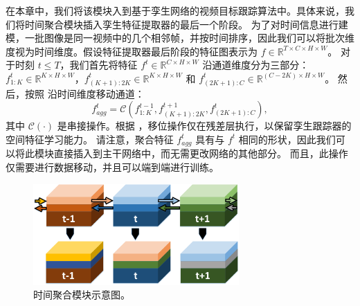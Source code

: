 在本章中，我们将该模块入到基于孪生网络的视频目标跟踪算法中。具体来说，我们将时间聚合模块插入孪生特征提取器的最后一个阶段。
为了对时间信息进行建模，一批图像是同一视频中的几个相邻帧，并按时间排序，因此我们可以将批次维度视为时间维度。假设特征提取器最后阶段的特征图表示为 $f \in \mathbb R ^ {T \times C \times H \times W}$。
对于时刻 $t \leq T$，我们首先将特征 $f^t \in \mathbb R ^ {C \times H \times W}$ 沿通道维度分为三部分：$f_{1:K}^t \in \mathbb R ^ {K \times H \times W}$，$f_{(K+1):2K}^t \in \mathbb R ^ {K \times H \times W}$ 和 $f_{(2K+1):C}^t \in \mathbb R ^ {(C-2K) \times H \times W}$。
然后，按照 \cite{lin2019tsm} 沿时间维度移动通道：
\begin{equation}
    f_{agg}^t = \mathcal{C}(f_{{1:K}}^{t-1}, f_{(K+1):2K}^{t+1}, f_{(2K+1):C}^{t}),
\end{equation}
其中 $\mathcal{C}(\cdot)$ 是串接操作。根据 \cite{lin2019tsm}，移位操作仅在残差层执行，以保留孪生跟踪器的空间特征学习能力。
请注意，聚合特征 $f_{agg}^t$ 具有与 $f^t$ 相同的形状，因此我们可以将此模块直接插入到主干网络中，而无需更改网络的其他部分。
而且，此操作仅需要进行数据移动，并且可以端到端进行训练。

\begin{figure}[t]
    \centering
    \includegraphics[width=0.7\textwidth]{Img/end/TSM_v1.pdf}
    \caption{时间聚合模块示意图。}
    \label{fig:TSM}
\end{figure}

